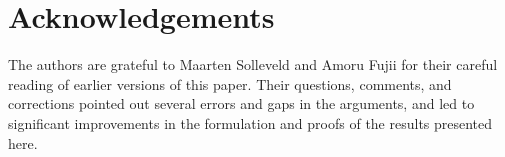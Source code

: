 \documentclass{amsart}
\theoremstyle{plain}
\numberwithin{equation}{section}
\theoremstyle{definition}
\begin{document}
\section*{Acknowledgements}

The authors are grateful to Maarten Solleveld and Amoru Fujii for their
careful reading of earlier versions of this paper.  Their questions,
comments, and corrections pointed out several errors and gaps in the
arguments, and led to significant improvements in the formulation and
proofs of the results presented here.



\end{document}
